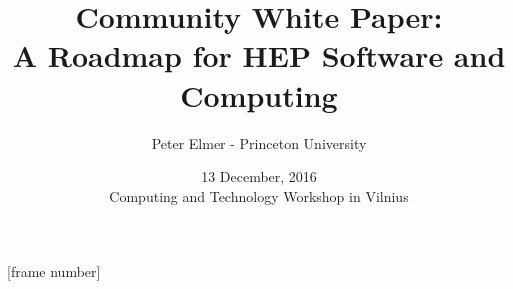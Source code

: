 \documentclass{beamer}
\title{Community White Paper: \\
       A Roadmap for HEP Software and Computing}
\author{Peter Elmer - Princeton University}
\date{13 December, 2016 \\ Computing and Technology Workshop in Vilnius}
\begin{document}
\maketitle

%
%

[frame number]

%







%
%






%






%
%










%




%


%





%


%
\end{document}

